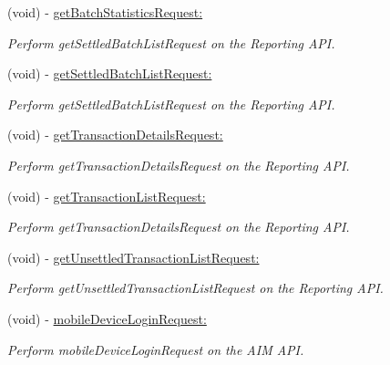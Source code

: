 \begin{DoxyCompactItemize}
(void) -\/ \hyperlink{interface_auth_net_a46d75652309982e05c800901ac86e5eb}{getBatchStatisticsRequest:}
\begin{DoxyCompactList}\small\item\em Perform getSettledBatchListRequest on the Reporting API. \item\end{DoxyCompactList}\item 
(void) -\/ \hyperlink{interface_auth_net_a1fa89b0779cc561949082cb567dba157}{getSettledBatchListRequest:}
\begin{DoxyCompactList}\small\item\em Perform getSettledBatchListRequest on the Reporting API. \item\end{DoxyCompactList}\item 
(void) -\/ \hyperlink{interface_auth_net_aceb44273bc91643ae24b3197fe41f5a1}{getTransactionDetailsRequest:}
\begin{DoxyCompactList}\small\item\em Perform getTransactionDetailsRequest on the Reporting API. \item\end{DoxyCompactList}\item 
(void) -\/ \hyperlink{interface_auth_net_aea170727593689d07fd6a522523bf222}{getTransactionListRequest:}
\begin{DoxyCompactList}\small\item\em Perform getTransactionDetailsRequest on the Reporting API. \item\end{DoxyCompactList}\item 
(void) -\/ \hyperlink{interface_auth_net_aa5bdf2aed5018970a50ee6e3184a6bf8}{getUnsettledTransactionListRequest:}
\begin{DoxyCompactList}\small\item\em Perform getUnsettledTransactionListRequest on the Reporting API. \item\end{DoxyCompactList}\item 
(void) -\/ \hyperlink{interface_auth_net_a69e0de01f90a5296752f90fcf5f9e893}{mobileDeviceLoginRequest:}
\begin{DoxyCompactList}\small\item\em Perform mobileDeviceLoginRequest on the AIM API. \item\end{DoxyCompactList}\item 

\end{DoxyCompactItemize}
